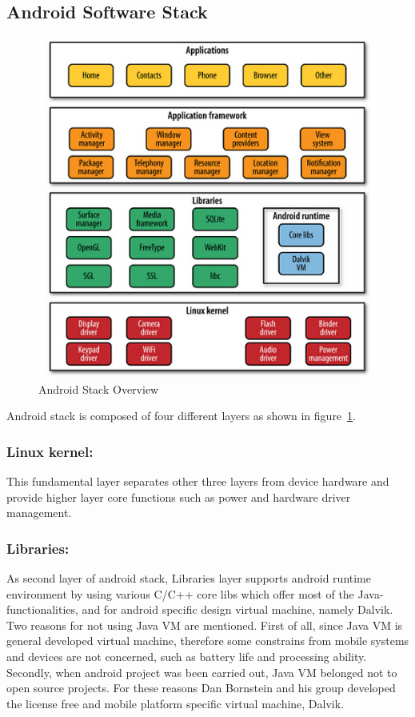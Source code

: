 \subsection{Android Software Stack}
\begin{figure}[!htbp]
	\centering
	\includegraphics[width=1.0\textwidth]{android-stack.jpg}
		\caption{Android Stack Overview \cite{learn_android}}
	\label{fig:android-stack}
\end{figure}
Android stack is composed of four different layers as shown in figure~\ref{fig:android-stack}.

\subsubsection{Linux kernel:}This fundamental layer separates other three layers  from  device hardware and provide higher layer core  functions such as  power and hardware driver management.
\subsubsection{Libraries:}As second layer of android stack,  Libraries layer supports android runtime environment by using various C/C++ core libs which offer most of the Java-functionalities, and for android specific design virtual machine, namely Dalvik\cite{learn_android}. Two reasons for not using Java VM are mentioned\cite{learn_android}. First of all, since Java VM is general developed virtual machine, therefore some constrains from mobile systems and devices are not concerned, such as battery life and processing ability. Secondly, when android project  was been carried out,  Java VM belonged not to open source projects. For these reasons Dan Bornstein and his group developed the license free and mobile platform specific  virtual machine, Dalvik. 

